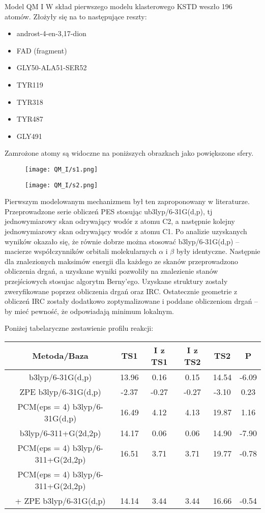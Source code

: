 \begin{section}{Model QM I}
 W skład pierwszego modelu klasterowego KSTD weszło 196 atomów. Złożyły się na to następujące reszty:
 \begin{itemize}
  \item androst-4-en-3,17-dion
  \item FAD (fragment)
  \item GLY50-ALA51-SER52
  \item TYR119
  \item TYR318
  \item TYR487
  \item GLY491
 \end{itemize}

 Zamrożone atomy są widoczne na poniższych obrazkach jako powiększone sfery.
 
 \begin{figure}[H]
  \texttt{[image: QM\_I/s1.png]}
\end{figure}

 \begin{figure}[H]
  \texttt{[image: QM\_I/s2.png]}
\end{figure}
 
 Pierwszym modelowanym mechanizmem był ten zaproponowany w literaturze. Przeprowadzone serie obliczeń PES stosując ub3lyp/6-31G(d,p), tj jednowymiarowy skan odrywający
 wodór z atomu C2, a następnie kolejny jednowymiarowy skan odrywający wodór z atomu C1. Po analizie uzyskanych wyników okazało się, że 
 równie dobrze można stosować b3lyp/6-31G(d,p) -- macierze współczynników orbitali molekularnych $\alpha$ i $\beta$ były identyczne. Następnie dla znalezionych maksimów energii
 dla każdego ze skanów przeprowadzono obliczenia drgań, a uzyskane wyniki pozwoliły na znalezienie stanów przejściowych stosujac algorytm Berny'ego. Uzyskane struktury zostały
 zweryfikowane poprzez obliczenia drgań oraz IRC. Ostatecznie geometrie z obliczeń IRC zostały dodatkowo zoptymalizowane i poddane obliczeniom drgań -- by mieć pewność, że odpowiadają
 minimum lokalnym.
 
 Poniżej tabelaryczne zestawienie profilu reakcji:
 
  \begin{tabular}{||c c c c c c||} 
 \hline
 Metoda/Baza & TS1 & I z TS1 & I z TS2 & TS2 & P \\ [0.5ex] 
 \hline\hline
b3lyp/6-31G(d,p) & 13.96 &  0.16 & 0.15 & 14.54 & -6.09 \\
ZPE b3lyp/6-31G(d,p) & -2.37  & -0.27 &  -0.27  & -3.10 & 0.23 \\
PCM(eps = 4) b3lyp/6-31G(d,p) & 16.49  & 4.12 & 4.13 & 19.87 & 1.16 \\
b3lyp/6-311+G(2d,2p) & 14.17  & 0.06  & 0.06 & 14.90 & -7.90 \\
PCM(eps = 4) b3lyp/6-311+G(2d,2p) & 16.51  & 3.71 & 3.71  & 19.77 & -0.78 \\
PCM(eps = 4) b3lyp/6-311+G(2d,2p) & & & & & \\ 
+ ZPE b3lyp/6-31G(d,p)  & 14.14  & 3.44  & 3.44 & 16.66 & -0.54 \\
 \hline
 

\end{tabular}
\end{section}
